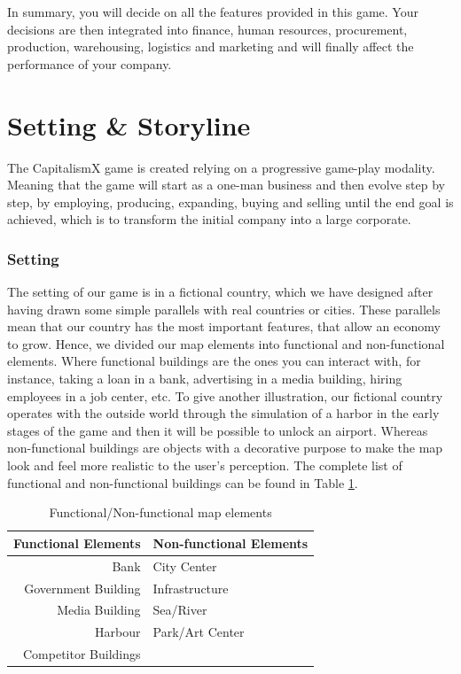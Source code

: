 \documentclass[11pt,titlepage,oneside,openany]{book}
\begin{document}
In summary, you will decide on all the features provided in this game. Your decisions are then integrated into finance, human resources, procurement, production, warehousing, logistics and marketing and will finally affect the performance of your company.

\section{Setting \& Storyline}
\label{SettingStory}
The CapitalismX game is created relying on a progressive game-play modality. Meaning that the game will start as a one-man business and then evolve step by step, by employing, producing, expanding, buying and selling  until the end goal is achieved, which is to transform the initial company into a large corporate. 

\subsubsection{Setting}
The setting of our game is in a fictional country, which we have designed after having drawn some simple parallels with real countries or cities. These parallels mean that our country has the most important features, that allow an economy to grow. Hence, we divided our map elements into functional and non-functional elements. Where functional buildings are the ones you can interact with, for instance, taking a loan in a bank, advertising in a media building, hiring employees in a job center, etc.  To give another illustration, our fictional country operates with the outside world through the simulation of a harbor in the early stages of the game and then it will be possible to unlock an airport. Whereas non-functional buildings are objects with a decorative purpose to make the map look and feel  more realistic to the user’s perception. The complete list of functional and non-functional buildings can be found in Table \ref{table:map-el}. 

\begin{table}[ht]
\centering
\begin{tabular}{r|l}
\hline 
 Functional Elements & Non-functional Elements\\
\hline \hline
 Bank & City Center  \\
 Government Building & Infrastructure \\
 Media Building & Sea/River \\
 Harbour & Park/Art Center  \\
 Competitor Buildings & \\
\hline
\end{tabular}
\caption{Functional/Non-functional map elements}
\label{table:map-el}
\end{table}
\end{document}
